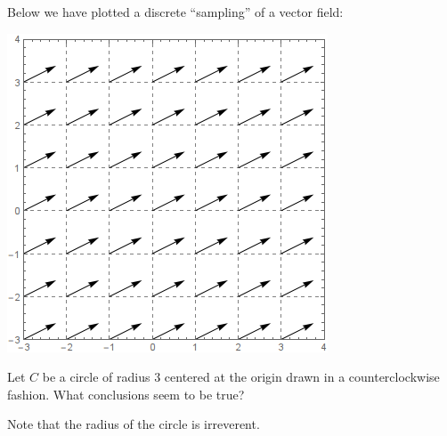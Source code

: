 \documentclass{ximera}
\begin{document}
\begin{exercise}
  Below we have plotted a discrete ``sampling'' of a vector field:
  \begin{image}
    \includegraphics{field2.png}
  \end{image}
  Let $C$ be a circle of radius $3$ centered at the origin drawn in a
  counterclockwise fashion.  What conclusions seem to be true?
  \begin{selectAll}
  \end{selectAll}
  \begin{hint}
    Note that the radius of the circle is irreverent. 
  \end{hint}
\end{exercise}
\end{document}
